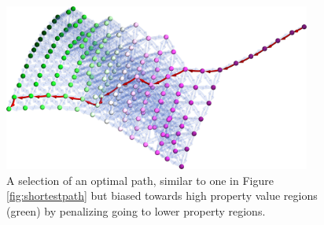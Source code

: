 \begin{figure}[h]
    \centering
    \includegraphics[width=0.9\textwidth]{pathplanning/InfeasibilityGliding_HighRMSAD.png}
    \caption{A selection of an optimal path, similar to one in Figure \ref{fig:shortestpath} but biased towards high property value regions (green) by penalizing going to lower property regions.}
    \label{fig:highrmsad}
\end{figure}



\printbibliography[heading=subbibintoc]